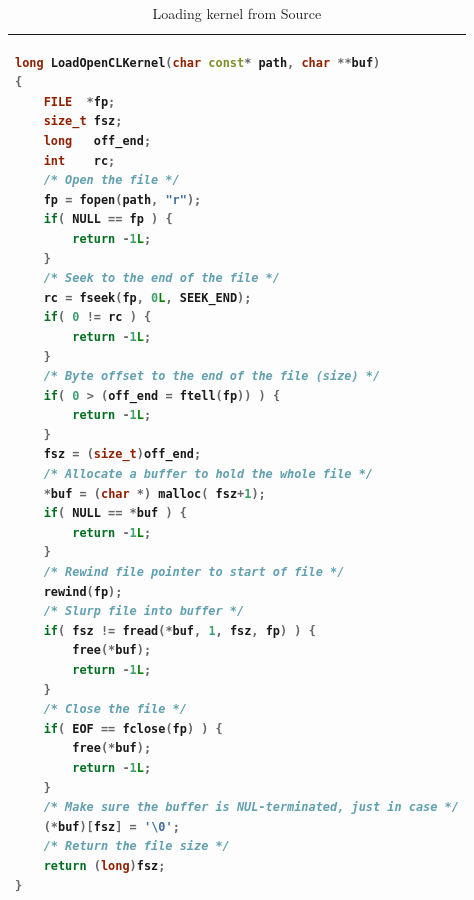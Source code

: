 \begin{table}[!h]
\centering
\caption{Loading kernel from Source}
\label{cnncode2:load-kernel-source}
\begin{tabular}{l}
\toprule
\begin{lstlisting}[columns=fullflexible, language=C++]
long LoadOpenCLKernel(char const* path, char **buf)
{
    FILE  *fp;
    size_t fsz;
    long   off_end;
    int    rc;
    /* Open the file */
    fp = fopen(path, "r");
    if( NULL == fp ) {
        return -1L;
    }
    /* Seek to the end of the file */
    rc = fseek(fp, 0L, SEEK_END);
    if( 0 != rc ) {
        return -1L;
    }
    /* Byte offset to the end of the file (size) */
    if( 0 > (off_end = ftell(fp)) ) {
        return -1L;
    }
    fsz = (size_t)off_end;
    /* Allocate a buffer to hold the whole file */
    *buf = (char *) malloc( fsz+1);
    if( NULL == *buf ) {
        return -1L;
    }
    /* Rewind file pointer to start of file */
    rewind(fp);
    /* Slurp file into buffer */
    if( fsz != fread(*buf, 1, fsz, fp) ) {
        free(*buf);
        return -1L;
    }
    /* Close the file */
    if( EOF == fclose(fp) ) {
        free(*buf);
        return -1L;
    }
    /* Make sure the buffer is NUL-terminated, just in case */
    (*buf)[fsz] = '\0';
    /* Return the file size */
    return (long)fsz;
}
\end{lstlisting}
\\
\bottomrule
\end{tabular}
\end{table}

